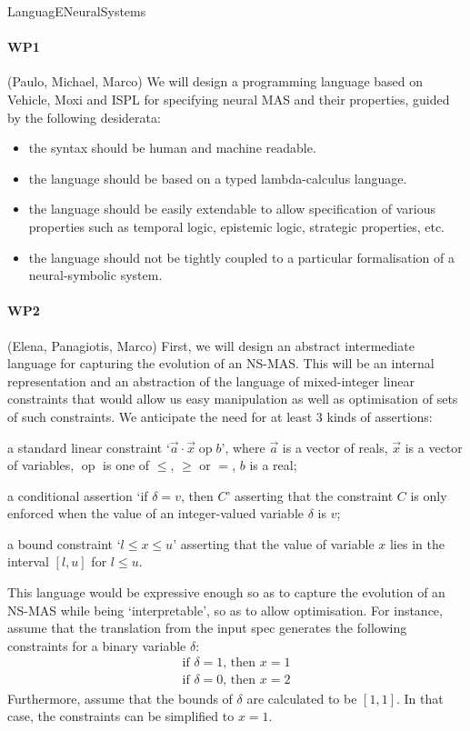 \documentclass[11pt]{article}
\newcommand{\op}{\mathop{\text{op}}}
\begin{document}
LanguagENeuralSystems

\paragraph{WP1} (Paulo, Michael, Marco) We will design a programming
language based on Vehicle, Moxi and ISPL for specifying neural MAS and
their properties, guided by the following desiderata:
\begin{itemize}
\item the syntax should be human and machine readable.  
\item the language should be based on a typed lambda-calculus language.
\item the language should be easily extendable to allow specification
  of various properties such as temporal logic, epistemic logic,
  strategic properties, etc.
\item the language should not be tightly coupled to a particular
  formalisation of a neural-symbolic system.
\end{itemize}

\paragraph{WP2} (Elena, Panagiotis, Marco) First, we will design an
abstract intermediate language for capturing the evolution of an
NS-MAS. This will be an internal representation and an abstraction of
the language of mixed-integer linear constraints that would allow us
easy manipulation as well as optimisation of sets of such
constraints. We anticipate the need for at least 3 kinds of
assertions:
\begin{inparaenum}[\it (i)]
\item a standard linear constraint `$\vec{a} \cdot \vec{x} \op b$',
  where $\vec{a}$ is a vector of reals, $\vec{x}$ is a vector of
  variables, $\op$ is one of $\leq$, $\geq$ or $=$, $b$ is a real;
\item a conditional assertion `if $\delta = v$, then $C$' asserting
  that the constraint $C$ is only enforced when the value of an
  integer-valued variable $\delta$ is $v$;
\item a bound constraint `$l \leq x \leq u$' asserting that the value
  of variable $x$ lies in the interval $[l,u]$ for $l\leq u$.
\end{inparaenum}
This language would be expressive enough so as to capture the
evolution of an NS-MAS while being `interpretable', so as to allow
optimisation.  For instance, assume that the translation from the
input spec generates the following constraints for a binary variable
$\delta$:
\[
  \begin{array}{l}
    \text{if }\delta = 1\text{, then }x = 1\\
    \text{if }\delta = 0\text{, then }x = 2
  \end{array}
\]
Furthermore, assume that the bounds of $\delta$ are calculated to be
$[1,1]$. In that case, the constraints can be simplified to $x=1$.
\end{document}
